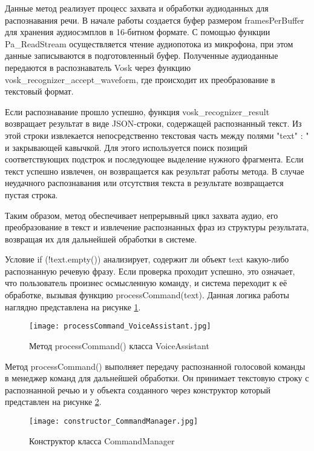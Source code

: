 Данные метод реализует процесс захвата и обработки аудиоданных для распознавания речи. В начале работы создается буфер размером framesPerBuffer для хранения аудиосэмплов в 16-битном формате. С помощью функции Pa\_ReadStream осуществляется чтение аудиопотока из микрофона, при этом данные записываются в подготовленный буфер. Полученные аудиоданные передаются в распознаватель Vosk через функцию vosk\_recognizer\_accept\_waveform, где происходит их преобразование в текстовый формат.

Если распознавание прошло успешно, функция vosk\_recognizer\_result возвращает результат в виде JSON-строки, содержащей распознанный текст. Из этой строки извлекается непосредственно текстовая часть между полями \string"text\string" : \string" и закрывающей кавычкой. Для этого используется поиск позиций соответствующих подстрок и последующее выделение нужного фрагмента. Если текст успешно извлечен, он возвращается как результат работы метода. В случае неудачного распознавания или отсутствия текста в результате возвращается пустая строка.

Таким образом, метод обеспечивает непрерывный цикл захвата аудио, его преобразование в текст и извлечение распознанных фраз из структуры результата, возвращая их для дальнейшей обработки в системе.

Условие if (!text.empty()) анализирует, содержит ли объект text какую-либо распознанную речевую фразу. Если проверка проходит успешно, это означает, что пользователь произнес осмысленную команду, и система переходит к её обработке, вызывая функцию processCommand(text). Данная логика работы наглядно представлена на рисунке \ref{fig:processCommand_VoiceAssistant}.

\begin{figure}[H]
	\centering
	\texttt{[image: processCommand\_VoiceAssistant.jpg]}
	\caption{Метод processCommand()  класса VoiceAssistant}
	\label{fig:processCommand_VoiceAssistant}
\end{figure}

Метод processCommand() выполняет передачу распознанной голосовой команды в менеджер команд для дальнейшей обработки. Он принимает текстовую строку с распознанной речью и у объекта созданного через конструктор который представлен на рисунке \ref{fig:constructor_CommandManager}.


\begin{figure}[H]
	\centering
	\texttt{[image: constructor\_CommandManager.jpg]}
	\caption{Конструктор класса CommandManager}
	\label{fig:constructor_CommandManager}
\end{figure}

